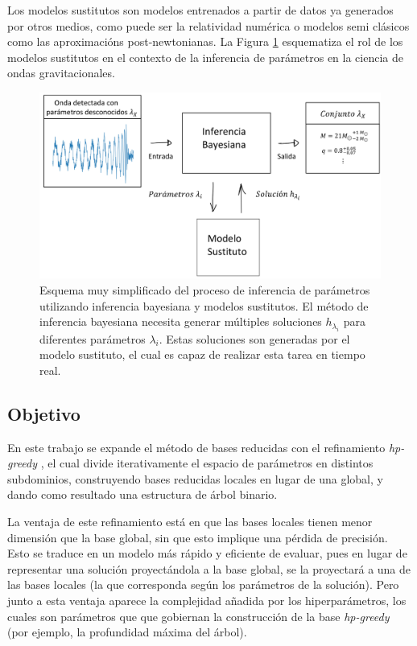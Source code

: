 Los modelos sustitutos son modelos entrenados a partir de datos ya generados por otros medios, como puede ser la relatividad numérica o modelos semi clásicos como las aproximacións post-newtonianas. La Figura \ref{fig:diagrama} esquematiza el rol de los modelos sustitutos en el contexto de la inferencia de parámetros en la ciencia de ondas gravitacionales.

\begin{figure}[h!]
\centering
\includegraphics[width=.8\columnwidth]{figs/diagrama-importancia-modelos.png}
\caption{Esquema muy simplificado del proceso de inferencia de parámetros utilizando inferencia bayesiana y modelos sustitutos. El método de inferencia bayesiana necesita generar múltiples soluciones $h_{\lambda_i}$ para diferentes parámetros $\lambda_i$. Estas soluciones son generadas por el modelo sustituto, el cual es capaz de realizar esta tarea en tiempo real.}
\label{fig:diagrama}
\end{figure}




\subsection*{Objetivo}

En este trabajo se expande el método de bases reducidas con el refinamiento \textit{hp-greedy} \cite{Cerino:2022dhr}, el cual divide iterativamente el espacio de parámetros en distintos subdominios, construyendo bases reducidas locales en lugar de una global, y dando como resultado una estructura de árbol binario.

La ventaja de este refinamiento está en que las bases locales tienen menor dimensión que la base global, sin que esto implique una pérdida de precisión. Esto se traduce en un modelo más rápido y eficiente de evaluar, pues en lugar de representar una solución proyectándola a la base global, se la proyectará a una de las bases locales (la que corresponda según los parámetros de la solución). 
Pero junto a esta ventaja aparece la complejidad añadida por los hiperparámetros, los cuales son parámetros que que gobiernan la construcción de la base \textit{hp-greedy} (por ejemplo, la profundidad máxima del árbol).


